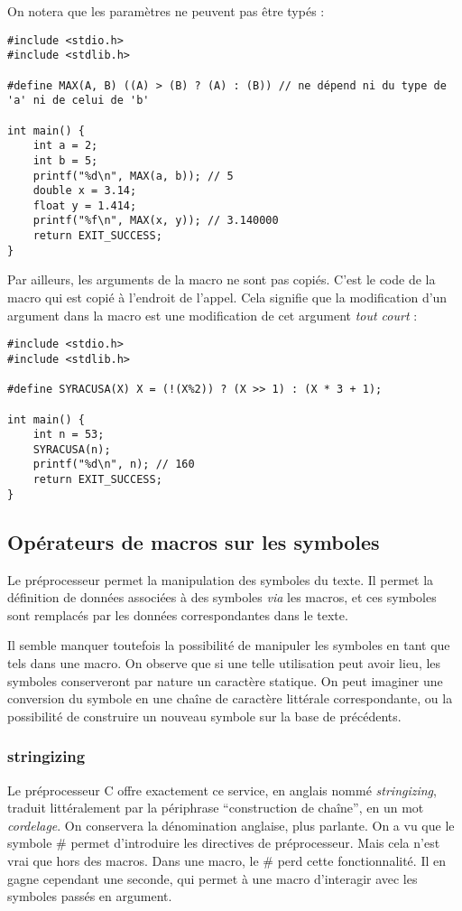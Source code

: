 \documentclass[../../../main.tex]{subfiles}
\begin{document}
On notera que les paramètres ne peuvent pas être typés :
\begin{verbatim}
#include <stdio.h>
#include <stdlib.h>

#define MAX(A, B) ((A) > (B) ? (A) : (B)) // ne dépend ni du type de 'a' ni de celui de 'b'

int main() {
	int a = 2;
	int b = 5;
	printf("%d\n", MAX(a, b)); // 5
	double x = 3.14;
	float y = 1.414;
	printf("%f\n", MAX(x, y)); // 3.140000
	return EXIT_SUCCESS;
}
\end{verbatim}
Par ailleurs, les arguments de la macro ne sont pas copiés. C'est le code de la macro qui est copié à l'endroit de l'appel. Cela signifie que la modification d'un argument dans la macro est une modification de cet argument \textit{tout court} :
\begin{verbatim}
#include <stdio.h>
#include <stdlib.h>

#define SYRACUSA(X) X = (!(X%2)) ? (X >> 1) : (X * 3 + 1);

int main() {
	int n = 53;
	SYRACUSA(n);
	printf("%d\n", n); // 160
	return EXIT_SUCCESS;
}
\end{verbatim}
\subsection{Opérateurs de macros sur les symboles} \label{sub:traitement_de_symboles}
Le préprocesseur permet la manipulation des symboles du texte. Il permet la définition de données associées à des symboles \textit{via} les macros, et ces symboles sont remplacés par les données correspondantes dans le texte.

Il semble manquer toutefois la possibilité de manipuler les symboles en tant que tels dans une macro. On observe que si une telle utilisation peut avoir lieu, les symboles conserveront par nature un caractère statique. On peut imaginer une conversion du symbole en une chaîne de caractère littérale correspondante, ou la possibilité de construire un nouveau symbole sur la base de précédents.
\subsubsection{stringizing}
Le préprocesseur C offre exactement ce service, en anglais nommé \textit{stringizing}, traduit littéralement par la périphrase ``construction de chaîne'', en un mot \textit{cordelage}. On conservera la dénomination anglaise, plus parlante.
On a vu que le symbole \# permet d'introduire les directives de préprocesseur. Mais cela n'est vrai que hors des macros. Dans une macro, le \# perd cette fonctionnalité. Il en gagne cependant une seconde, qui permet à une macro d'interagir avec les symboles passés en argument.
\end{document}
